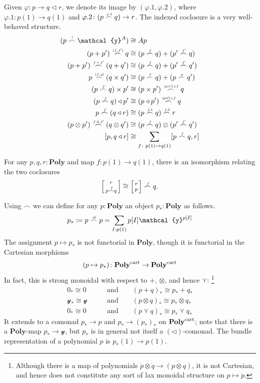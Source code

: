 \documentclass[11pt, one side, article]{memoir}
\makeatletter
\theoremstyle{definition}
\theoremstyle{plain}
\newcommand{\Cat}[1]{\mathbf{#1}}%
\newcommand{\id}{\mathrm{id}}
\newcommand{\then}{\mathbin{\fatsemi}}
\newcommand{\tn}[1]{\textnormal{#1}}
\newcommand{\yon}{\mathcal{y}}
\newcommand{\poly}{\Cat{Poly}}
\newcommand{\polycart}{\poly^{\tn{cart}}}
\newcommand{\0}{\textsf{0}}
\newcommand{\1}{\tn{\textsf{1}}}
\newcommand{\tri}{\mathbin{\triangleleft}}
\newcommand{\biglens}[2]{
     \begin{bmatrix}{\vphantom{f_f^f}#2} \\ {\vphantom{f_f^f}#1} \end{bmatrix}
}
\newcommand{\littlelens}[2]{
     \begin{bsmallmatrix}{\vphantom{f}#2} \\ {\vphantom{f}#1} \end{bsmallmatrix}
}
\newcommand{\lens}[2]{
  \relax\if@display
     \biglens{#1}{#2}
  \else
     \littlelens{#1}{#2}
  \fi
}
\newcommand{\indexcoclscale}[1]{\scalebox{.7}{#1}}
\newcommand{\cocl}[1]{
	\scriptsize\overset{\,\indexcoclscale{$#1$}}{\frown}\normalsize
}
\newcommand{\qqand}{\qquad\text{and}\qquad}
\makeatother
\begin{document}
Given $\varphi\colon p\to q\tri r$, we denote its image by $(\varphi.1,\varphi.2)$, where $\varphi.1\colon p(1)\to q(1)$ and $\varphi.2\colon (p\cocl{\varphi.1}q)\to r$. The indexed coclosure is a very well-behaved structure.
\begin{align}
	(p\cocl{!}\yon^A)&\cong Ap\\
	(p+p')\cocl{(f,f')}q&\cong(p\cocl{f}q)+(p'\cocl{f'}q)\\
	(p+p')\cocl{f+f'}(q+q')&\cong(p\cocl{f}q)+(p'\cocl{f'}q')\\
	p\cocl{(f,g)}(q\times q')&\cong(p\cocl{f}q)+(p\cocl{g}q')\\
	(p\cocl{f}q)\times p'&\cong(p\times p')\cocl{(p\times!)\then f}q\\
	(p\cocl{f}q)\tri p'&\cong(p\tri p')\cocl{(p\tri!)\then f}q\\
	p\cocl{f}(q\tri r)&\cong(p\cocl{f.1}q)\cocl{f.2}r\\
	(p\otimes p')\cocl{f\otimes f'}(q\otimes q')&\cong(p\cocl{f}q)\otimes(p'\cocl{f'}q')\\
	[p,q\tri r]&\cong\sum_{f\colon p(1)\to q(1)}[p\cocl{f}q,r]
\end{align}

For any $p,q,r:\poly$ and map $f\colon p(1)\to q(1)$, there is an isomorphism relating the two coclosures
\begin{equation}
	\lens{p\cocl{f}q}{r}\cong\lens{p}{r}\cocl{f}q.
\end{equation}

Using $\frown$ we can define for any $p:\poly$ an object $p_*:\poly$ as follows.
\begin{equation}\label{eqn.p_star}
p_*\coloneqq p\cocl{\id}p=\sum_{I: p(1)}p[I]\yon^{p[I]}
\end{equation}
The assignment $p\mapsto p_*$ is not functorial in $\poly$, though it is functorial in the Cartesian morphisms
\begin{equation}
	(p\mapsto p_*)\colon\polycart\to\polycart
\end{equation}
In fact, this is strong monoidal with respect to $+$, $\otimes$, and hence $\curlyvee$:%
\footnote{Although there is a map of polynomials $\dot{p}\otimes\dot{q}\to\dot{(p\otimes q)}$, it is not Cartesian, and hence does not constitute any sort of lax monoidal structure on $p\mapsto\dot{p}$.}
\begin{align}
	0_*\cong 0
	&\qqand
	(p+q)_*\cong p_*+q_*\\
	\yon_*\cong\yon
	&\qqand
	(p\otimes q)_*\cong p_*\otimes q_*\\
	0_*\cong0
	&\qqand
	(p\curlyvee q)_*\cong p_*\curlyvee q_*
\end{align}
It extends to a comonad $p_*\to p$ and $p_*\to (p_*)_*$ on $\polycart$; note that there is a $\poly$-map $p_*\to\yon$, but $p_*$ is in general not itself a $(\tri)$-comonad. The bundle representation of a polynomial $p$ is $p_*(1)\to p(1)$. 
\end{document}
